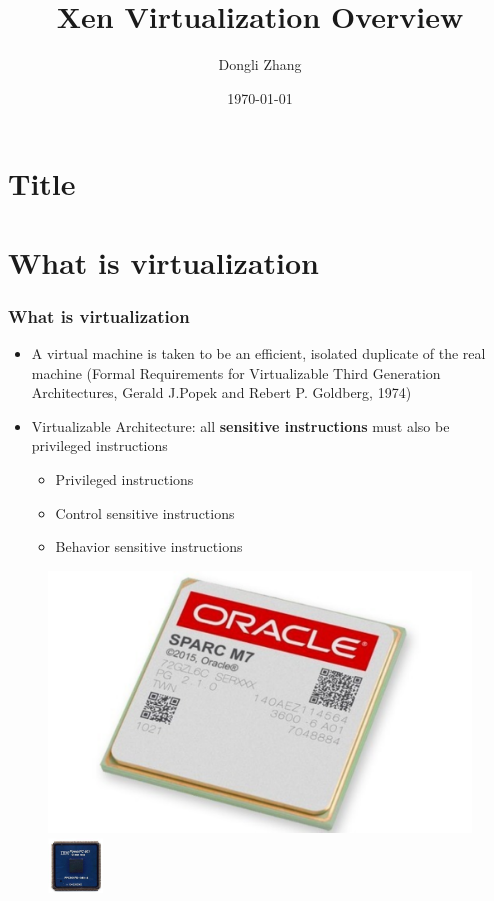 \documentclass[aspectratio=169]{beamer}
\title[Xen Overview]{Xen Virtualization Overview} %
\author{Dongli Zhang} %
\institute[Oracle] %
{
Oracle Asia Research and Development Centers (Beijing) \\ %
\medskip
\textit{dongli.zhang@oracle.com} %
}
\date{\today} %
\begin{document}

\section{Title}
\begin{frame}
\titlepage %
\end{frame}


\section{What is virtualization}
\begin{frame}
\frametitle{What is virtualization}
\begin{itemize}
\item A virtual machine is taken to be an efficient, isolated duplicate of the real machine
(Formal Requirements for Virtualizable Third Generation Architectures, Gerald J.Popek and Rebert P. Goldberg, 1974) \pause
\item Virtualizable Architecture: all \textbf{sensitive instructions} must also be privileged instructions
	\begin{itemize}
		\item Privileged instructions
		\item Control sensitive instructions
		\item Behavior sensitive instructions
	\end{itemize}
\end{itemize}
\pause
\begin{center}
\begin{figure}
\includegraphics[width=0.3\linewidth]{figures/sparc.pdf}
\includegraphics[width=0.2\linewidth]{figures/power.pdf}
\end{figure}
\end{center}
\end{frame}
\end{document}
